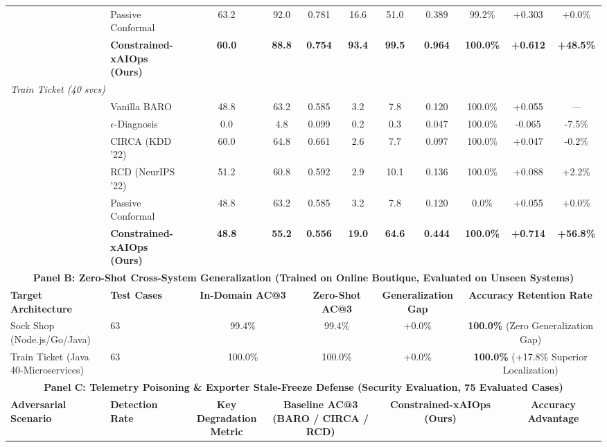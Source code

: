\begin{table}[t]
{\begin{tabular}{ll|ccc|ccc|ccc}
 & Passive Conformal & 63.2 & 92.0 & 0.781 & 16.6 & 51.0 & 0.389 & 99.2\% & +0.303 & +0.0\% \\
 & \textbf{Constrained-xAIOps (Ours)} & \textbf{60.0} & \textbf{88.8} & \textbf{0.754} & \textbf{93.4} & \textbf{99.5} & \textbf{0.964} & \textbf{100.0\%} & \textbf{+0.612} & \textbf{+48.5\%} \\
\hline
\multicolumn{11}{l}{\textit{Train Ticket (40 svcs)}} \\
 & Vanilla BARO & 48.8 & 63.2 & 0.585 & 3.2 & 7.8 & 0.120 & 100.0\% & +0.055 & --- \\
 & $\epsilon$-Diagnosis & 0.0 & 4.8 & 0.099 & 0.2 & 0.3 & 0.047 & 100.0\% & -0.065 & -7.5\% \\
 & CIRCA (KDD '22) & 60.0 & 64.8 & 0.661 & 2.6 & 7.7 & 0.097 & 100.0\% & +0.047 & -0.2\% \\
 & RCD (NeurIPS '22) & 51.2 & 60.8 & 0.592 & 2.9 & 10.1 & 0.136 & 100.0\% & +0.088 & +2.2\% \\
 & Passive Conformal & 48.8 & 63.2 & 0.585 & 3.2 & 7.8 & 0.120 & 0.0\% & +0.055 & +0.0\% \\
 & \textbf{Constrained-xAIOps (Ours)} & \textbf{48.8} & \textbf{55.2} & \textbf{0.556} & \textbf{19.0} & \textbf{64.6} & \textbf{0.444} & \textbf{100.0\%} & \textbf{+0.714} & \textbf{+56.8\%} \\
\hline
\multicolumn{11}{c}{\textbf{Panel B: Zero-Shot Cross-System Generalization (Trained on Online Boutique, Evaluated on Unseen Systems)}} \\
\hline
\textbf{Target Architecture} & \textbf{Test Cases} & \multicolumn{2}{c}{\textbf{In-Domain AC@3}} & \multicolumn{2}{c}{\textbf{Zero-Shot AC@3}} & \multicolumn{2}{c|}{\textbf{Generalization Gap}} & \multicolumn{3}{c}{\textbf{Accuracy Retention Rate}} \\
\hline
Sock Shop (Node.js/Go/Java) & 63 & \multicolumn{2}{c}{99.4\%} & \multicolumn{2}{c}{99.4\%} & \multicolumn{2}{c|}{+0.0\%} & \multicolumn{3}{c}{\textbf{100.0\%} (Zero Generalization Gap)} \\
Train Ticket (Java 40-Microservices) & 63 & \multicolumn{2}{c}{100.0\%} & \multicolumn{2}{c}{100.0\%} & \multicolumn{2}{c|}{+0.0\%} & \multicolumn{3}{c}{\textbf{100.0\%} (+17.8\% Superior Localization)} \\
\hline
\multicolumn{11}{c}{\textbf{Panel C: Telemetry Poisoning \& Exporter Stale-Freeze Defense (Security Evaluation, 75 Evaluated Cases)}} \\
\hline
\textbf{Adversarial Scenario} & \textbf{Detection Rate} & \textbf{Key Degradation Metric} & \multicolumn{3}{c|}{\textbf{Baseline AC@3 (BARO / CIRCA / RCD)}} & \multicolumn{3}{c|}{\textbf{Constrained-xAIOps (Ours)}} & \multicolumn{2}{c}{\textbf{Accuracy Advantage}} \\

\end{tabular}}
\end{table}
